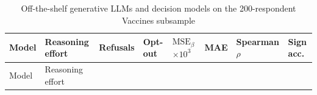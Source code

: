 \documentclass[
  11pt,
  letterpaper,
]{article}
\makeatletter
\newcommand\table@defaultsize{\footnotesize}
\let\table@size\table@defaultsize
\newcommand\nexttablesize[1]{\gdef\table@size{#1}}
\makeatother
\begin{document}
\nexttablesize{\footnotesize}
{\def\LTcaptype{apptbl}
\begin{longtable}[]{@{}
  >{\raggedright\arraybackslash}p{}
  >{\raggedright\arraybackslash}p{}
  >{\raggedleft\arraybackslash}p{}
  >{\raggedleft\arraybackslash}p{}
  >{\raggedleft\arraybackslash}p{}
  >{\raggedleft\arraybackslash}p{}
  >{\raggedleft\arraybackslash}p{}
  >{\raggedleft\arraybackslash}p{}@{}}
\caption{{\label{apptbl-llm-baseline}}Off-the-shelf generative LLMs and
decision models on the 200-respondent Vaccines subsample}\tabularnewline
\toprule\noalign{}
\begin{minipage}[b]{\linewidth}\raggedright
Model
\end{minipage} & \begin{minipage}[b]{\linewidth}\raggedright
Reasoning effort
\end{minipage} & \begin{minipage}[b]{\linewidth}\raggedleft
Refusals
\end{minipage} & \begin{minipage}[b]{\linewidth}\raggedleft
Opt-out
\end{minipage} & \begin{minipage}[b]{\linewidth}\raggedleft
\(\mathrm{MSE}_\beta\) \(\times 10^3\)
\end{minipage} & \begin{minipage}[b]{\linewidth}\raggedleft
MAE
\end{minipage} & \begin{minipage}[b]{\linewidth}\raggedleft
Spearman \(\rho\)
\end{minipage} & \begin{minipage}[b]{\linewidth}\raggedleft
Sign acc.
\end{minipage} \\
\midrule\noalign{}
\endfirsthead
\toprule\noalign{}
\begin{minipage}[b]{\linewidth}\raggedright
Model
\end{minipage} & \begin{minipage}[b]{\linewidth}\raggedright
Reasoning effort
\end{minipage} & \begin{minipage}[b]{\linewidth}\raggedleft

\end{minipage}
\end{longtable}}
\end{document}
